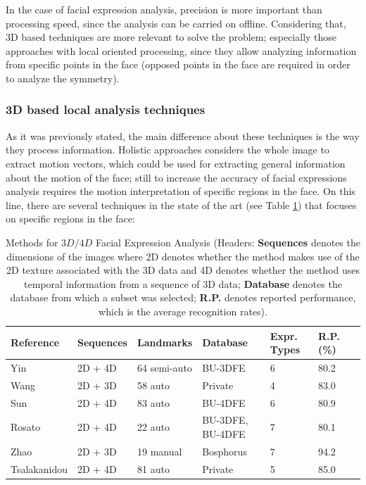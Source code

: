 In the case of facial expression analysis, precision is more important than processing speed, since the analysis can be carried on offline. Considering that, 3D based techniques are more relevant to solve the problem; especially those approaches with local oriented processing, since they allow analyzing information from specific points in the face (opposed points in the face are required in order to analyze the symmetry).

\subsubsection{3D based local analysis techniques}
As it was previously stated, the main difference about these techniques is the way they process information. Holistic approaches considers the whole image to extract motion vectors, which could be used for extracting general information about the motion of the face; still to increase the accuracy of facial expressions analysis requires the motion interpretation of specific regions in the face. On this line, there are several techniques in the state of the art (see Table \ref{tb:3DLocalTechniques}) that focuses on specific regions in the face:

\begin{table}[h]
\scriptsize
\begin{center}
\begin{tabular}{||p{2.7cm}|p{2.0cm}|p{2.0cm}|p{2.0cm}|p{1.5cm}|p{1.5cm}|p{1.5cm}||} \hline \hline
Reference & Sequences & Landmarks & Database & Expr. Types & R.P. (\%) \\ \hline \hline
\normalsize{Yin \cite{Yin2006}} & 2D + 4D & 64 semi-auto & BU-3DFE & 6 & 80.2 \\ \hline \hline
\normalsize{Wang \cite{Wang2007}} & 2D + 3D & 58 auto & Private & 4 & 83.0 \\ \hline \hline
\normalsize{Sun \cite{SunFer2008}} & 2D + 4D & 83 auto & BU-4DFE & 6 & 80.9 \\ \hline \hline
\normalsize{Rosato \cite{Rosato2008}} & 2D + 4D & 22 auto & BU-3DFE, BU-4DFE & 7 & 80.1 \\ \hline \hline
\normalsize{Zhao \cite{Zhao01}} & 2D + 3D & 19 manual & Bosphorus & 7 & 94.2 \\ \hline \hline
\normalsize{Tsalakanidou \cite{Tsalakanidou2010}} & 2D + 4D & 81 auto & Private & 5 & 85.0 \\ \hline \hline
\end{tabular}
\end{center}
\caption[Methods for $3D/4D$ Facial Expression Analysis]{Methods for $3D/4D$ Facial Expression Analysis (\footnotesize{Headers: \textbf{Sequences} denotes the dimensions of the images where 2D denotes whether the method makes use of the 2D texture associated with the 3D data and 4D denotes whether the method uses temporal information from a sequence of 3D data; \textbf{Database} denotes the database from which a subset was selected; \textbf{R.P.} denotes reported performance, which is the average recognition rates}).}
\label{tb:3DLocalTechniques}
\end{table}

